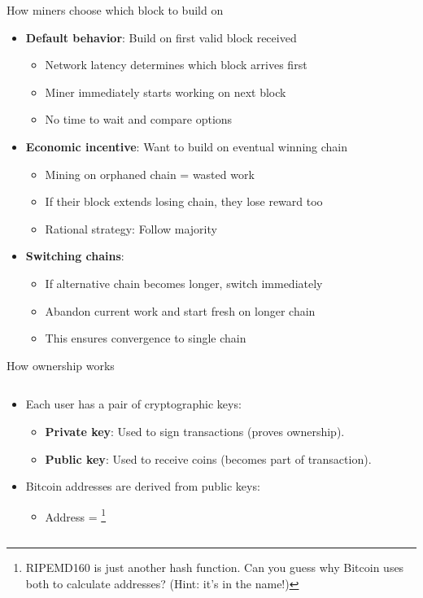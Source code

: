 \documentclass[aspectratio=169, lualatex, handout]{beamer}
\begin{document}
\begin{frame}{How miners choose which block to build on}
	\begin{itemize}
		\item \textbf{Default behavior}: Build on first valid block received
		      \begin{itemize}
			      \item Network latency determines which block arrives first
			      \item Miner immediately starts working on next block
			      \item No time to wait and compare options
		      \end{itemize}
		\item \textbf{Economic incentive}: Want to build on eventual winning chain
		      \begin{itemize}
			      \item Mining on orphaned chain = wasted work
			      \item If their block extends losing chain, they lose reward too
			      \item Rational strategy: Follow majority
		      \end{itemize}
		\item \textbf{Switching chains}:
		      \begin{itemize}
			      \item If alternative chain becomes longer, switch immediately
			      \item Abandon current work and start fresh on longer chain
			      \item This ensures convergence to single chain
		      \end{itemize}
	\end{itemize}
\end{frame}

\begin{frame}{How ownership works}
	\begin{columns}[c]
		\begin{column}{1\textwidth}
			\begin{itemize}
				\item Each user has a pair of cryptographic keys:
				      \begin{itemize}
					      \item \textbf{Private key}: Used to sign transactions (proves ownership).
					      \item \textbf{Public key}: Used to receive coins (becomes part of transaction).
				      \end{itemize}
				\item Bitcoin addresses are derived from public keys:
				      \begin{itemize}
					      \item Address = \footnote{RIPEMD160 is just another hash function. Can you guess why Bitcoin uses both to calculate addresses? (Hint: it's in the name!)}
				      \end{itemize}
			\end{itemize}
		\end{column}
	\end{columns}
\end{frame}
\end{document}
